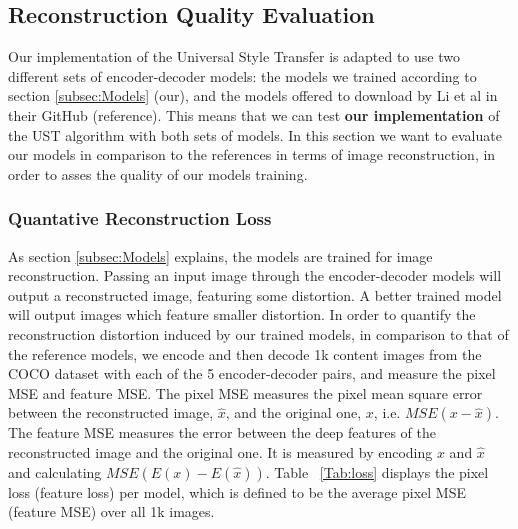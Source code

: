\subsection{Reconstruction Quality Evaluation}

Our implementation of the Universal Style Transfer is adapted to use two different sets of encoder-decoder models: the models we trained according to section \ref{subsec:Models} (our), and the models offered to download by Li et al in their GitHub (reference). This means that we can test \textbf{our implementation} of the UST algorithm with both sets of models. In this section we want to evaluate our models in comparison to the references in terms of image reconstruction, in order to asses the quality of our models training.

\subsubsection{Quantative Reconstruction Loss}
As section \ref{subsec:Models} explains, the models are trained for image reconstruction. Passing an input image through the encoder-decoder models will output a reconstructed image, featuring some distortion. A better trained model will output images which feature smaller distortion. In order to quantify the reconstruction distortion induced by our trained models, in comparison to that of the reference models, we encode and then decode 1k content images from the COCO dataset with each of the 5 encoder-decoder pairs, and measure the pixel MSE and feature MSE. The pixel MSE measures the pixel mean square error between the reconstructed image, $\hat{x}$, and the original one, $x$, i.e. $MSE(x - \hat{x})$. The feature MSE measures the error between the deep features of the reconstructed image and the original one. It is measured by encoding $x$ and $\hat{x}$ and calculating $MSE(E(x)-E(\hat{x}))$. Table ~\ref{Tab:loss} displays the pixel loss (feature loss) per model, which is defined to be the average pixel MSE (feature MSE) over all 1k images.


